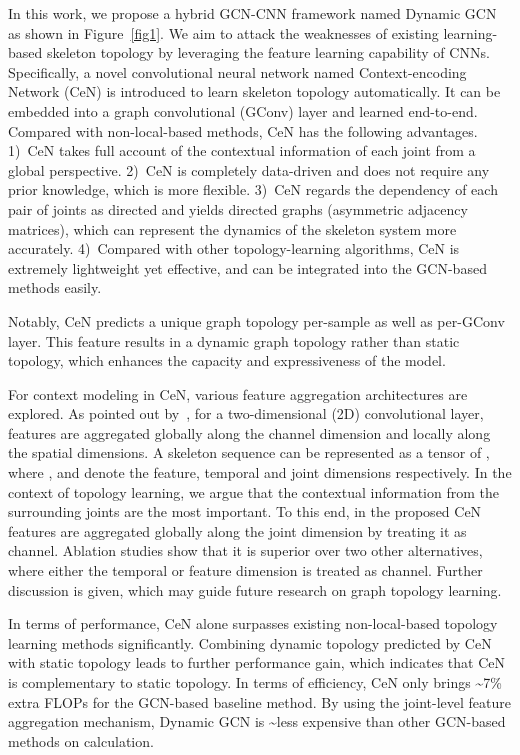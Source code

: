 \documentclass[sigconf]{acmart}
\begin{document}
In this work, we propose a hybrid GCN-CNN framework named Dynamic GCN as shown in Figure~\ref{fig1}. We aim to attack the weaknesses of existing learning-based skeleton topology by leveraging the feature learning capability of CNNs. Specifically, a novel convolutional neural network named Context-encoding Network (CeN) is introduced to learn skeleton topology automatically. It can be embedded into a graph convolutional (GConv) layer and learned end-to-end. Compared with non-local-based methods, CeN has the following advantages. 1)~CeN takes full account of the contextual information of each joint from a global perspective. 2)~CeN is completely data-driven and does not require any prior knowledge, which is more flexible. 3)~CeN regards the dependency of each pair of joints as directed and yields directed graphs (asymmetric adjacency matrices), which can represent the dynamics of the skeleton system more accurately. 4)~Compared with other topology-learning algorithms, CeN is extremely lightweight yet effective, and can be integrated into the GCN-based methods easily.

Notably, CeN predicts a unique graph topology per-sample as well as per-GConv layer. This feature results in a dynamic graph topology rather than static topology, which enhances the capacity and expressiveness of the model.






For context modeling in CeN, various feature aggregation architectures are explored. As pointed out by~\cite{lili}, for a two-dimensional (2D) convolutional layer, features are aggregated globally along the channel dimension and locally along the spatial dimensions. A skeleton sequence can be represented as a tensor of , where ,  and  denote the feature, temporal and joint dimensions respectively. In the context of topology learning, we argue that the contextual information from the surrounding joints are the most important. To this end, in the proposed CeN features are aggregated globally along the joint dimension by treating it as channel. Ablation studies show that it is superior over two other alternatives, where either the temporal or feature dimension is treated as channel. Further discussion is given, which may guide future research on graph topology learning.

In terms of performance, CeN alone surpasses existing non-local-based topology learning methods significantly. Combining dynamic topology predicted by CeN with static topology leads to further performance gain, which indicates that CeN is complementary to static topology. In terms of efficiency, CeN only brings \textasciitilde7\% extra FLOPs for the GCN-based baseline method. By using the joint-level feature aggregation mechanism, Dynamic GCN is \textasciitilde less expensive than other GCN-based methods on calculation.
\end{document}
